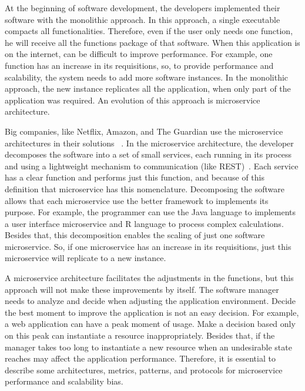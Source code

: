 At the beginning of software development, the developers implemented their software with the monolithic approach. In this approach, a single executable compacts all functionalities. Therefore, even if the user only needs one function, he will receive all the functions package of that software. When this application is on the internet, can be difficult to improve performance. For example, one function has an increase in its requisitions, so, to provide performance and scalability, the system needs to add more software instances. In the monolithic approach, the new instance replicates all the application, when only part of the application was required. An evolution of this approach is microservice architecture.

Big companies, like Netflix, Amazon, and The Guardian use the microservice architectures in their solutions ~\cite{Francesco2017ResearchAdoption}. In the microservice architecture, the developer decomposes the software into a set of small services, each running in its process and using a lightweight mechanism to communication (like REST)~\cite{Fowler2014Microservices}. Each service has a clear function and performs just this function, and because of this definition that microservice has this nomenclature. Decomposing the software allows that each microservice use the better framework to implements its purpose. For example, the programmer can use the Java language to implements a user interface microservice and R language to process complex calculations. Besides that, this decomposition enables the scaling of just one software microservice. So, if one microservice has an increase in its requisitions, just this microservice will replicate to a new instance.

A microservice architecture facilitates the adjustments in the functions, but this approach will not make these improvements by itself. The software manager needs to analyze and decide when adjusting the application environment. Decide the best moment to improve the application is not an easy decision. For example, a web application can have a peak moment of usage. Make a decision based only on this peak can instantiate a resource inappropriately. Besides that, if the manager takes too long to instantiate a new resource when an undesirable state reaches may affect the application performance. Therefore, it is essential to describe some architectures, metrics, patterns, and protocols for microservice performance and scalability bias.

